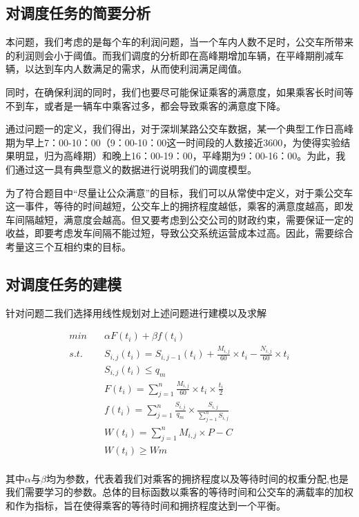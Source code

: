 \documentclass[UTF8]{ctexart}
\begin{document}
	\subsection{对调度任务的简要分析}
	本问题，我们考虑的是每个车的利润问题，当一个车内人数不足时，公交车所带来的利润则会小于阈值。而我们调度的分析即在高峰期增加车辆，在平峰期削减车辆，以达到车内人数满足的需求，从而使利润满足阈值。
	
	同时，在确保利润的同时，我们也要尽可能保证乘客的满意度，如果乘客长时间等不到车，或者是一辆车中乘客过多，都会导致乘客的满意度下降。
	
	通过问题一的定义，我们得出，对于深圳某路公交车数据，某一个典型工作日高峰期为早上7：00-10：00（9：00-10：00这一时间段的人数接近3600，为使得实验结果明显，归为高峰期）和晚上16：00-19：00，平峰期为9：00-16：00。为此，我们通过这一具有典型意义的数据进行说明我们的调度模型。
	
	为了符合题目中“尽量让公众满意”的目标，我们可以从常使中定义，对于乘公交车这一事件，等待的时间越短，公交车上的拥挤程度越低，乘客的满意度越高，即发车间隔越短，满意度会越高。但又要考虑到公交公司的财政约束，需要保证一定的收益，即要考虑发车间隔不能过短，导致公交系统运营成本过高。因此，需要综合考量这三个互相约束的目标。
	
	\subsection{对调度任务的建模}
	
	针对问题二我们选择用线性规划对上述问题进行建模以及求解
	
	\begin{align}
	min \quad &\alpha F(t_i)+\beta f(t_i)\\
	s.t.\quad 
	& S_{i,j}(t_i)=S_{i,j-1}(t_i)+\frac{M_{i,j}}{60}\times t_i-\frac{N_{i,j}}{60}\times t_i\\
	&S_{i,j}(t_i)\leq q_m\\
	&F(t_i)=\sum_{j=1}^{n}\frac{M_{i,j}}{60}\times t_i\times \frac{t_i}{2}\\
	&f(t_i)=\sum_{j=1}^{n}\frac{S_{i,j}}{q_m}\times \frac{S_{i,j}}{\sum_{j=1}^{n}S_{i,j}}\\
	&W(t_i)= \sum^{n}_{j=1}M_{i,j}\times P-C \\
	&W(t_i)\geq Wm\\
	\end{align}
	
	其中$\alpha$与$\beta$均为参数，代表着我们对乘客的拥挤程度以及等待时间的权重分配,也是我们需要学习的参数。总体的目标函数以乘客的等待时间和公交车的满载率的加权和作为指标，旨在使得乘客的等待时间和拥挤程度达到一个平衡。
	
\end{document}
